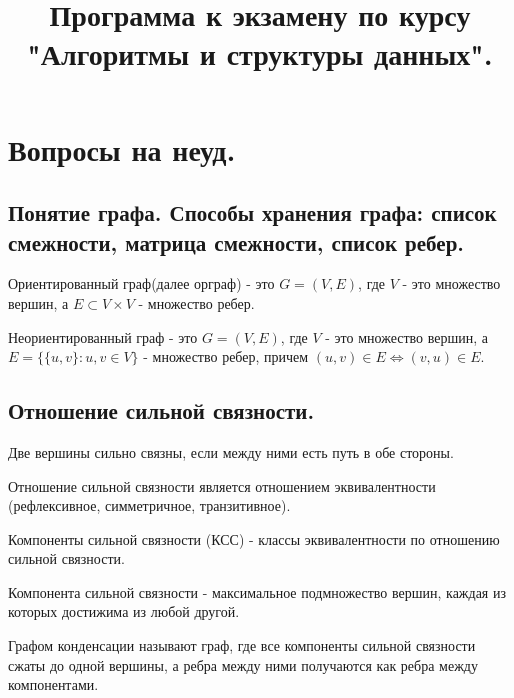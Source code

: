 \documentclass[a4paper,14pt]{article}
\title{Программа к экзамену по курсу "Алгоритмы и структуры данных".}
\date{}
\begin{document}
    \maketitle
    \newpage
    \tableofcontents
    \newpage
    \section{Вопросы на неуд.}
    
    \subsection{Понятие графа. Способы хранения графа: список смежности, матрица смежности, список ребер.}

    \begin{Def}
        Ориентированный граф(далее орграф) - это $G = (V,E)$, где $V$ - это множество вершин, а $E\subset V\times V$ - множество ребер.
    \end{Def}
    \begin{Def}
        Неориентированный граф - это $G = (V,E)$, где $V$ - это множество вершин, а $E=\{\{u,v\}: u,v \in V\}$ - множество ребер, причем $(u,v)\in E \Leftrightarrow (v,u)\in E$.
    \end{Def}

    \subsection{Отношение сильной связности.}
    \label{subsec:strongly_connected_components}
    \begin{Def}
    Две вершины сильно связны, если между ними есть путь в обе стороны.
    \end{Def}
    Отношение сильной связности является отношением эквивалентности (рефлексивное, симметричное, транзитивное).
    \begin{Def}
        Компоненты сильной связности (КСС) - классы эквивалентности по отношению сильной связности.
    \end{Def}
    \begin{Def}
        Компонента сильной связности - максимальное подмножество вершин, каждая из которых достижима из любой другой.
    \end{Def}
    \begin{Def}
        Графом конденсации называют граф, где все компоненты сильной
        связности сжаты до одной вершины, а ребра между ними
        получаются как ребра между компонентами.
    \end{Def}
\end{document}
